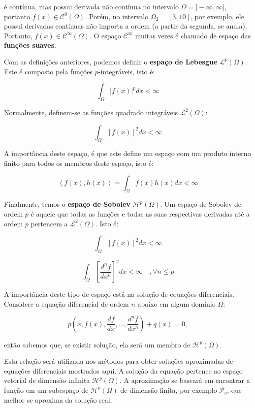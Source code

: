     é contínua, mas possui derivada não contínua no intervalo $\Omega = ]-\infty, \infty[$, portanto $f(x) \in \mathcal{C}^0(\Omega)$. Porém, no intervalo $\Omega_2 = [3, 10]$, por exemplo, ele possui derivadas contínuas não importa a ordem (a partir da segunda, se anula). Portanto, $f(x) \in \mathcal{C}^\infty(\Omega)$. O espaço $\mathcal{C}^\infty$ muitas vezes é chamado de espaço das \textbf{funções suaves}.


    Com as definições anteriores, podemos definir o \textbf{espaço de Lebesgue} $\mathcal{L}^p(\Omega)$. Este é composto pela funções $p$-integráveis, isto é:

        \begin{equation}
            \int_\Omega \left|f(x)\right|^p dx < \infty
        \end{equation}

    Normalmente, definem-se as funções quadrado integráveis $\mathcal{L}^2(\Omega)$:

    \begin{equation}
        \int_\Omega \left[f(x)\right]^2 dx < \infty
    \end{equation}

    A importância deste espaço, é que este define um espaço com um produto interno finito para todos os membros deste espaço, isto é:

    \begin{equation}
        \left\langle f(x), h(x) \right\rangle = \int_\Omega f(x)h(x) dx < \infty
    \end{equation}

    Finalmente, temos o \textbf{espaço de Sobolev} $\mathcal{H}^p(\Omega)$. Um espaço de Sobolev de ordem $p$ é aquele que todas as funções e todas as suas respectivas derivadas até a ordem $p$ pertencem a $\mathcal{L}^2(\Omega)$. Isto é:

    \begin{equation}
        \int_\Omega \left[f(x)\right]^2 dx < \infty
    \end{equation}

    \begin{equation}
        \int_\Omega \left[\frac{d^nf}{dx^n}\right]^2 dx < \infty \quad, \forall n \leq p
    \end{equation}

    A importância deste tipo de espaço está na solução de equações diferenciais. Considere a equação diferencial de ordem $n$ abaixo em algum domínio $\Omega$:

    \begin{equation*}
        p\left(x, f(x), \frac{df}{dx}, \ldots, \frac{d^nf}{dx^n}\right) + q(x) = 0,
    \end{equation*}

    \noindent então sabemos que, se existir solução, ela será um membro de $\mathcal{H}^p(\Omega)$.

    Esta relação será utilizada nos métodos para obter soluções aproximadas de equações diferenciais mostrados aqui. A solução da equação pertence ao espaço vetorial de dimensão infinita $\mathcal{H}^p(\Omega)$. A aproximação se baseará em encontrar a função em um subespaço de $\mathcal{H}^p(\Omega)$ de dimensão finita, por exemplo $\mathcal{P}_q$, que melhor se aproxima da solução real.